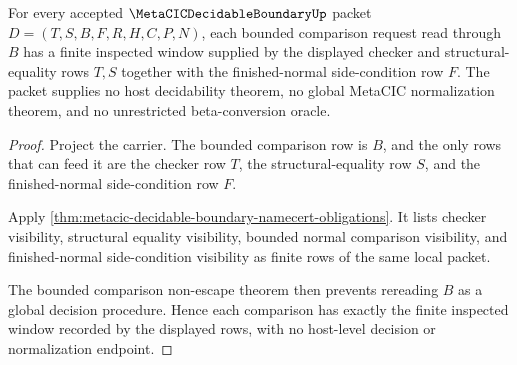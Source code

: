 \begin{theorem}
\label{thm:metacic-decidable-boundary-window-totality}
For every accepted $\MetaCICDecidableBoundaryUp$ packet $D=(T,S,B,F,R,H,C,P,N)$, each bounded comparison request read through $B$ has a finite inspected window supplied by the displayed checker and structural-equality rows $T,S$ together with the finished-normal side-condition row $F$. The packet supplies no host decidability theorem, no global MetaCIC normalization theorem, and no unrestricted beta-conversion oracle.
\end{theorem}
\begin{proof}
Project the carrier. The bounded comparison row is $B$, and the only rows that can feed it are the checker row $T$, the structural-equality row $S$, and the finished-normal side-condition row $F$.

Apply \autoref{thm:metacic-decidable-boundary-namecert-obligations}. It lists checker visibility, structural equality visibility, bounded normal comparison visibility, and finished-normal side-condition visibility as finite rows of the same local packet.

The bounded comparison non-escape theorem then prevents rereading $B$ as a global decision procedure. Hence each comparison has exactly the finite inspected window recorded by the displayed rows, with no host-level decision or normalization endpoint.
\end{proof}


